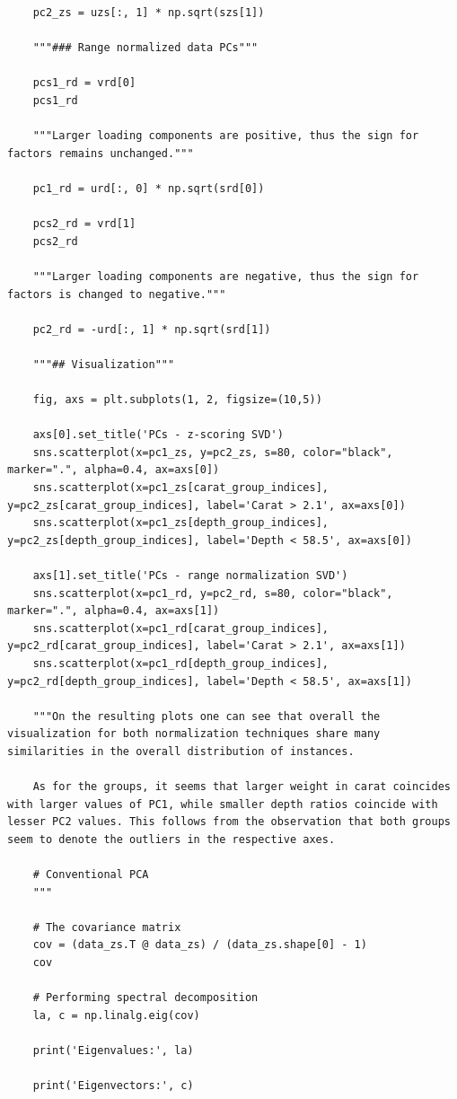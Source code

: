 \documentclass[12pt,a4paper]{article}
\begin{document}
\begin{lstlisting}
	pc2_zs = uzs[:, 1] * np.sqrt(szs[1])
	
	"""### Range normalized data PCs"""
	
	pcs1_rd = vrd[0]
	pcs1_rd
	
	"""Larger loading components are positive, thus the sign for factors remains unchanged."""
	
	pc1_rd = urd[:, 0] * np.sqrt(srd[0])
	
	pcs2_rd = vrd[1]
	pcs2_rd
	
	"""Larger loading components are negative, thus the sign for factors is changed to negative."""
	
	pc2_rd = -urd[:, 1] * np.sqrt(srd[1])
	
	"""## Visualization"""
	
	fig, axs = plt.subplots(1, 2, figsize=(10,5))
	
	axs[0].set_title('PCs - z-scoring SVD')
	sns.scatterplot(x=pc1_zs, y=pc2_zs, s=80, color="black", marker=".", alpha=0.4, ax=axs[0])
	sns.scatterplot(x=pc1_zs[carat_group_indices], y=pc2_zs[carat_group_indices], label='Carat > 2.1', ax=axs[0])
	sns.scatterplot(x=pc1_zs[depth_group_indices], y=pc2_zs[depth_group_indices], label='Depth < 58.5', ax=axs[0])
	
	axs[1].set_title('PCs - range normalization SVD')
	sns.scatterplot(x=pc1_rd, y=pc2_rd, s=80, color="black", marker=".", alpha=0.4, ax=axs[1])
	sns.scatterplot(x=pc1_rd[carat_group_indices], y=pc2_rd[carat_group_indices], label='Carat > 2.1', ax=axs[1])
	sns.scatterplot(x=pc1_rd[depth_group_indices], y=pc2_rd[depth_group_indices], label='Depth < 58.5', ax=axs[1])
	
	"""On the resulting plots one can see that overall the visualization for both normalization techniques share many similarities in the overall distribution of instances.
	
	As for the groups, it seems that larger weight in carat coincides with larger values of PC1, while smaller depth ratios coincide with lesser PC2 values. This follows from the observation that both groups seem to denote the outliers in the respective axes.
	
	# Conventional PCA
	"""
	
	# The covariance matrix
	cov = (data_zs.T @ data_zs) / (data_zs.shape[0] - 1)
	cov
	
	# Performing spectral decomposition
	la, c = np.linalg.eig(cov)
	
	print('Eigenvalues:', la)
	
	print('Eigenvectors:', c)
	

\end{lstlisting}
\end{document}
